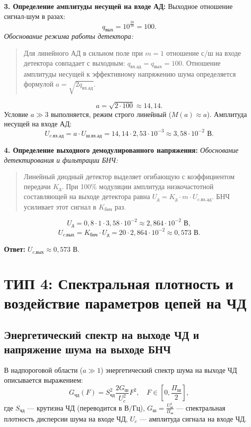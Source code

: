\documentclass[12pt,a4paper]{article}
\begin{document}
\textbf{3. Определение амплитуды несущей на входе АД:}
Выходное отношение сигнал-шум в разах:
\begin{equation}
q_{\text{вых}} = 10^{\frac{20}{10}} = 100.
\end{equation}
\textit{Обоснование режима работы детектора:}
\begin{quote}
Для линейного АД в сильном поле при $m=1$ отношение с/ш на входе детектора совпадает с выходным: $q_{\text{вх.ад}} = q_{\text{вых}} = 100$. Отношение амплитуды несущей к эффективному напряжению шума определяется формулой $a = \sqrt{2 q_{\text{вх.ад}}}$.
\end{quote}
\begin{equation}
a = \sqrt{2 \cdot 100} \approx 14{,}14.
\end{equation}
Условие $a \gg 3$ выполняется, режим строго линейный ($M(a) \approx a$).
Амплитуда несущей на входе АД:
\begin{equation}
U_{c.\text{вх.ад}} = a \cdot U_{\text{ш.вх.ад}} = 14{,}14 \cdot 2{,}53 \cdot 10^{-3} \approx 3{,}58 \cdot 10^{-2}\text{ В}.
\end{equation}

\textbf{4. Определение выходного демодулированного напряжения:}
\textit{Обоснование детектирования и фильтрации БНЧ:}
\begin{quote}
Линейный диодный детектор выделяет огибающую с коэффициентом передачи $K_{\text{д}}$. При 100\% модуляции амплитуда низкочастотной составляющей на выходе детектора равна $U_{\text{д}} = K_{\text{д}} \cdot m \cdot U_{c.\text{вх.ад}}$. БНЧ усиливает этот сигнал в $K_{\text{бнч}}$ раз.
\end{quote}
\begin{equation}
U_{\text{д}} = 0{,}8 \cdot 1 \cdot 3{,}58 \cdot 10^{-2} \approx 2{,}864 \cdot 10^{-2}\text{ В},
\end{equation}
\begin{equation}
U_{c.\text{вых}} = K_{\text{бнч}} \cdot U_{\text{д}} = 20 \cdot 2{,}864 \cdot 10^{-2} \approx 0{,}573\text{ В}.
\end{equation}

\textbf{Ответ:} $U_{c.\text{вых}} \approx 0{,}573\text{ В}$.

\newpage
\section{ТИП 4: Спектральная плотность и воздействие параметров цепей на ЧД}

\subsection{Энергетический спектр на выходе ЧД и напряжение шума на выходе БНЧ}
В надпороговой области ($a \gg 1$) энергетический спектр шума на выходе ЧД описывается выражением:
\begin{equation}
G_{\text{чд}}(F) = S_{\text{чд}}^2 \frac{2 G_{\text{ш}}}{U_c^2} F^2, \quad F \in \left[0, \frac{\Pi_{\text{ш}}}{2}\right],
\end{equation}
где $S_{\text{чд}}$ --- крутизна ЧД (переводится в $\text{В/Гц}$), $G_{\text{ш}} = \frac{U_{\text{ш}}^2}{\Pi_{\text{ш}}}$ --- спектральная плотность дисперсии шума на входе ЧД, $U_c$ --- амплитуда сигнала на входе ЧД.
\end{document}
